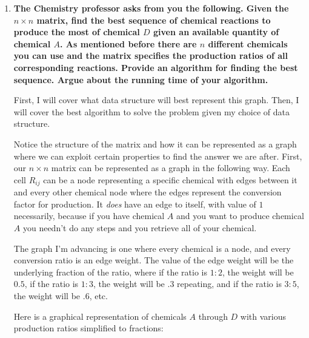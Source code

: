 \documentclass[11pt]{article}
\begin{document}
\begin{enumerate}[label=\textbf{\Alph*.}]
\item  \textbf{The Chemistry professor asks from you the
following. Given the $n \times n$ matrix, find the best sequence of
chemical reactions to produce the most of chemical $D$ given an
available quantity of chemical $A$. As mentioned before there are $n$
different chemicals you can use and the matrix specifies the
production ratios of all corresponding reactions. Provide an algorithm
for finding the best sequence. Argue about the running time of your
algorithm.}

First, I will cover what data structure will best represent this
graph. Then, I will cover the best algorithm to solve the problem
given my choice of data structure.

Notice the structure of the matrix and how it can be represented
as a graph where we can exploit certain properties to find the 
answer we are after. First, our $n \times n$ matrix can be represented
as a graph in the following way. Each cell $R_{ij}$ can be a node
representing a specific chemical with edges between it and every
other chemical node where the edges represent the conversion factor
for production. It \emph{does} have an edge to itself, with value
of $1$ necessarily, because if you have chemical $A$ and you want
to produce chemical $A$ you needn't do any steps and you retrieve
all of your chemical.

The graph I'm advancing is one where every chemical
is a node, and every conversion ratio is an edge weight. The value
of the edge weight will be the underlying fraction of the ratio,
where if the ratio is $1 : 2$, the weight will be $0.5$, if the
ratio is $1 : 3$, the weight will be $.3$ repeating, and if the
ratio is $3 : 5$, the weight will be $.6$, etc.

Here is a graphical representation of
chemicals $A$ through $D$ with various production ratios simplified
to fractions:

\begin{center}
\end{center}
\end{enumerate}
\end{document}
